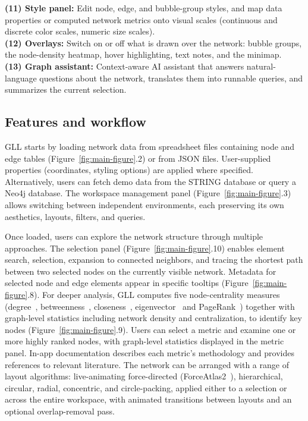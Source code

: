 \textbf{(11) Style panel:} Edit node, edge, and bubble-group styles, and map data properties or computed network metrics onto visual scales (continuous and discrete color scales, numeric size scales). \\
\textbf{(12) Overlays:} Switch on or off what is drawn over the network: bubble groups, the node-density heatmap, hover highlighting, text notes, and the minimap. \\
\textbf{(13) Graph assistant:} Context-aware AI assistant that answers natural-language questions about the network, translates them into runnable queries, and summarizes the current selection. \\

\subsection{Features and workflow}
GLL starts by loading network data from spreadsheet files containing node and edge tables (Figure~\ref{fig:main-figure}.2) or from JSON files. User-supplied properties (coordinates, styling options) are applied where specified. Alternatively, users can fetch demo data from the STRING database or query a Neo4j database. The workspace management panel (Figure~\ref{fig:main-figure}.3) allows switching between independent environments, each preserving its own aesthetics, layouts, filters, and queries.

Once loaded, users can explore the network structure through multiple approaches. The selection panel (Figure~\ref{fig:main-figure}.10) enables element search, selection, expansion to connected neighbors, and tracing the shortest path between two selected nodes on the currently visible network. Metadata for selected node and edge elements appear in specific tooltips (Figure~\ref{fig:main-figure}.8). For deeper analysis, GLL computes five node-centrality measures (degree~\citep{freemanCentralitySocialNetworks1978}, betweenness~\citep{freemanSetMeasuresCentrality1977a}, closeness~\citep{bavelasCommunicationPatternsTaskOriented1950a}, eigenvector~\citep{bonacichFactoringWeightingApproaches1972,newmanMathematicsNetworks2018a} and PageRank~\citep{brinAnatomyLargescaleHypertextual1998a}) together with graph-level statistics including network density and centralization, to identify key nodes (Figure~\ref{fig:main-figure}.9). Users can select a metric and examine one or more highly ranked nodes, with graph-level statistics displayed in the metric panel. In-app documentation describes each metric's methodology and provides references to relevant literature. The network can be arranged with a range of layout algorithms: live-animating force-directed (ForceAtlas2~\citep{jacomyForceAtlas2ContinuousGraph2014}), hierarchical, circular, radial, concentric, and circle-packing, applied either to a selection or across the entire workspace, with animated transitions between layouts and an optional overlap-removal pass.

